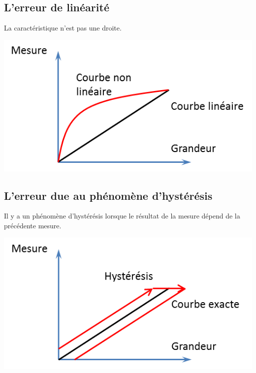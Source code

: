 \documentclass[10pt]{article}
\begin{document}
\subsection{L'erreur de linéarité}
\begin{minipage}[c]{.45\linewidth}
La caractéristique n'est pas une droite.
\end{minipage}\hfill
\begin{minipage}[c]{.45\linewidth}
\begin{center}
\includegraphics[width=.8\textwidth]{images/linearite}
\end{center}
\end{minipage}


\subsection{L'erreur due au phénomène d'hystérésis}	
\begin{minipage}[c]{.45\linewidth}
Il y a un phénomène d'hystérésis lorsque le résultat de la mesure dépend de la précédente mesure.


\end{minipage}\hfill
\begin{minipage}[c]{.45\linewidth}
\begin{center}
\includegraphics[width=.8\textwidth]{images/hysteresis}
\end{center}
\end{minipage}
\end{document}
